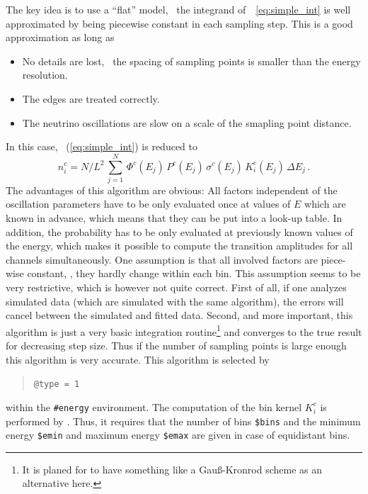 The key idea is to use a ``flat'' model, \ie\ the integrand 
of~\eq~\ref{eq:simple_int}  is well approximated by being piecewise
constant in each sampling step. This is a good approximation as long as
\begin{itemize}
\item
 No details are lost, \ie\ the spacing of sampling points 
is smaller than the energy resolution.
\item
The edges are treated correctly.
\item
 The neutrino oscillations are slow on a scale of the smapling point distance.
\end{itemize}
In this case, \eq~(\ref{eq:simple_int}) is reduced to
\begin{equation}
\label{eq:algo_one}
n_i^c=N/L^2 \, \sum_{j=1}^N \,  \Phi^c(E_j)\,
P^c(E_j)\,
\sigma^c(E_j)\,
K_i^c(E_j) \, \Delta E_j \,.
\end{equation}
The advantages of this algorithm are obvious: All factors
independent of the oscillation parameters have to be only evaluated once
at values of $E$ which are known in advance, which means that they can be put 
into a look-up table. In addition, the probability
has to be only evaluated at previously known values of the energy, which
makes it possible to compute the transition amplitudes for all channels
simultaneously. One assumption is that all involved factors are piece-wise
constant, \ie, they hardly change within each bin. This 
assumption seems to be very restrictive, which is however not quite correct.
First of all, if one analyzes simulated data (which are simulated with the same algorithm), the errors
will cancel between the simulated and fitted data. Second, and more important,
this algorithm is just a very basic integration routine\footnote{It is planed 
for to have something like a Gau\ss-Kronrod scheme as an alternative here.} and converges to
the true result for decreasing step size. Thus if the number of sampling
points is large enough this algorithm is very accurate. 
This algorithm is selected by
%
%
\begin{quote}
{\tt \tb @type = 1}
\end{quote}
within the {\tt \#energy} environment.
The computation of the bin kernel $K_i^c$ is performed
by \GLOBES. Thus, it requires that the number of bins
{\tt \$bins} and the minimum energy {\tt \$emin} and maximum energy {\tt \$emax} are given in case of equidistant bins.
%
